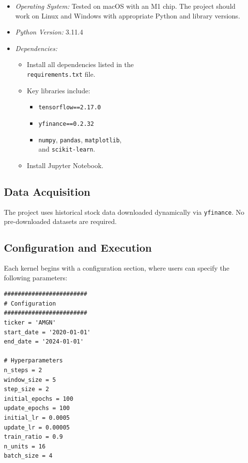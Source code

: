 \documentclass[10pt,twocolumn]{article}
\begin{document}
\begin{itemize}
    \item \textit{Operating System:} Tested on macOS with an M1 chip. The project should work on Linux and Windows with appropriate Python and library versions.
    \item \textit{Python Version:} 3.11.4
    \item \textit{Dependencies:}
    \begin{itemize}
        \item Install all dependencies listed in the \\ \texttt{requirements.txt} file.
        \item Key libraries include:
        \begin{itemize}
            \item \texttt{tensorflow==2.17.0}
            \item \texttt{yfinance==0.2.32}
            \item \texttt{numpy}, \texttt{pandas}, \texttt{matplotlib}, \\ and \texttt{scikit-learn}.
        \end{itemize}
        \item Install Jupyter Notebook.
    \end{itemize}
\end{itemize}

\subsection{Data Acquisition}

The project uses historical stock data downloaded dynamically via \texttt{yfinance}. No pre-downloaded datasets are required.

\subsection{Configuration and Execution}

Each kernel begins with a configuration section, where users can specify the following parameters:
\begin{verbatim}
########################
# Configuration
########################
ticker = 'AMGN'
start_date = '2020-01-01' 
end_date = '2024-01-01'

# Hyperparameters
n_steps = 2
window_size = 5
step_size = 2
initial_epochs = 100
update_epochs = 100
initial_lr = 0.0005
update_lr = 0.00005
train_ratio = 0.9
n_units = 16
batch_size = 4
\end{verbatim}
\end{document}
